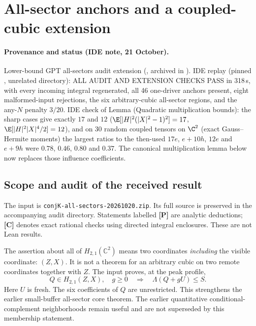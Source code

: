 \section{All-sector anchors and a coupled-cubic extension}
\label{ch:all-sector-audit-extension}

\paragraph{Provenance and status (IDE note, 21 October).} Lower-bound GPT all-sectors audit extension (, archived in
). IDE replay  (pinned , unrelated directory): ALL AUDIT AND
EXTENSION CHECKS PASS in 318\,s, with every incoming integral regenerated, all 46 one-driver anchors present, eight malformed-input rejections, the six arbitrary-cubic
all-sector regions, and the any-$N$ penalty $3/20$. IDE check of Lemma (Quadratic multiplication bounds): the sharp cases give exactly $17$ and $12$
($\E[|H|^2(|X|^2-1)^2]=17$, $\E[|H|^2|X|^4/2]=12$), and on 30 random coupled tensors on $\C^2$ (exact Gauss--Hermite moments) the largest ratios to the then-used $17e$, $e+10h$, $12e$
and $e+9h$ were $0.78$, $0.46$, $0.80$ and $0.37$. The canonical multiplication lemma below now replaces those influence coefficients.

\subsection{Scope and audit of the received result}
The input is \texttt{conjK-all-sectors-20261020.zip}. Its full source is
preserved in the accompanying audit directory. Statements labelled
\textbf{[P]} are analytic deductions; \textbf{[C]} denotes exact rational
checks using directed integral enclosures. These are not Lean results.

The assertion about all of $H_{2,1}(\mathbb C^2)$ means two coordinates
\emph{including} the visible coordinate: $(Z,X)$. It is not a theorem for
an arbitrary cubic on two remote coordinates together with $Z$.
The input proves, at the peak profile,
\[
 Q\in H_{2,1}(Z,X),\quad g\ge0
 \quad\Longrightarrow\quad \Lambda(Q+gU)\le S.
\]
Here $U$ is fresh. The six coefficients of $Q$ are unrestricted.
This strengthens the earlier small-buffer all-sector core theorem.
The earlier quantitative conditional-complement neighborhoods remain
useful and are not superseded by this membership statement.

